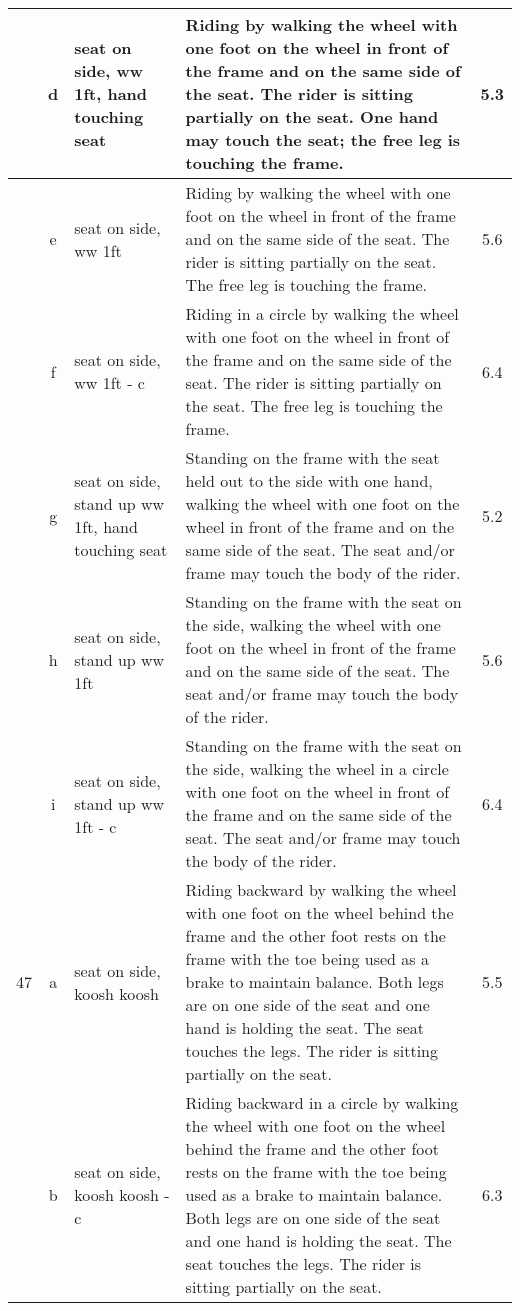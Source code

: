 \begin{longtable}{|r|c|p{4cm}|p{8cm}|c|}
\hline
  & d & seat on side, ww 1ft, hand touching seat  & Riding by walking the wheel with one foot on the wheel in front of the frame and on the same side of the seat. The rider is sitting partially on the seat. One hand may touch the seat; the free leg is touching the frame. & 5.3 \\ 
\hline
  & e & seat on side, ww 1ft  & Riding by walking the wheel with one foot on the wheel in front of the frame and on the same side of the seat. The rider is sitting partially on the seat. The free leg is touching the frame.  & 5.6 \\ 
\hline
  & f & seat on side, ww 1ft - c  & Riding in a circle by walking the wheel with one foot on the wheel in front of the frame and on the same side of the seat. The rider is sitting partially on the seat. The free leg is touching the frame.  & 6.4 \\ 
\hline
  & g & seat on side, stand up ww 1ft, hand touching seat & Standing on the frame with the seat held out to the side with one hand, walking the wheel with one foot on the wheel in front of the frame and on the same side of the seat. The seat and/or frame may touch the body of the rider. & 5.2 \\ 
\hline
  & h & seat on side, stand up ww 1ft & Standing on the frame with the seat on the side, walking the wheel with one foot on the wheel in front of the frame and on the same side of the seat. The seat and/or frame may touch the body of the rider.  & 5.6 \\ 
\hline
  & i & seat on side, stand up ww 1ft - c & Standing on the frame with the seat on the side, walking the wheel in a circle with one foot on the wheel in front of the frame and on the same side of the seat. The seat and/or frame may touch the body of the rider.  & 6.4 \\ 
\hline
47  & a & seat on side, koosh koosh & Riding backward by walking the wheel with one foot on the wheel behind the frame and the other foot rests on the frame with the toe being used as a brake to maintain balance. Both legs are on one side of the seat and one hand is holding the seat. The seat touches the legs. The rider is sitting partially on the seat. & 5.5 \\ 
\hline
  & b & seat on side, koosh koosh -c  & Riding backward in a circle by walking the wheel with one foot on the wheel behind the frame and the other foot rests on the frame with the toe being used as a brake to maintain balance. Both legs are on one side of the seat and one hand is holding the seat. The seat touches the legs. The rider is sitting partially on the seat. & 6.3 \\ 

\end{longtable}
